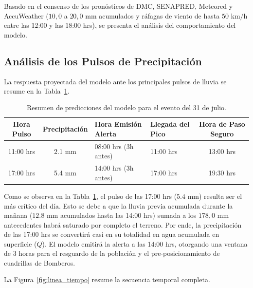 \documentclass[11pt,a4paper]{article}
\begin{document}
Basado en el consenso de los pronósticos de DMC, SENAPRED, Meteored y AccuWeather ($10,0$ a $20,0\text{ mm}$ acumulados y ráfagas de viento de hasta $50\text{ km/h}$ entre las 12:00 y las 18:00 hrs), se presenta el análisis del comportamiento del modelo.

\subsection{Análisis de los Pulsos de Precipitación}

La respuesta proyectada del modelo ante los principales pulsos de lluvia se resume en la Tabla~\ref{tab:pulsos}.

\begin{table}[htbp]
\centering
\caption{Resumen de predicciones del modelo para el evento del 31 de julio.}
\vspace{0.2cm}
\begin{tabular}{@{}ccllc@{}}
\toprule
\textbf{Hora Pulso} & \textbf{Precipitación} & \textbf{Hora Emisión Alerta} & \textbf{Llegada del Pico} & \textbf{Hora de Paso Seguro} \\ \midrule
11:00 hrs & 2.1 mm & 08:00 hrs (3h antes) & 11:00 hrs & 13:00 hrs \\
17:00 hrs & 5.4 mm & 14:00 hrs (3h antes) & 17:00 hrs & 19:30 hrs \\ \bottomrule
\end{tabular}
\label{tab:pulsos}
\end{table}

Como se observa en la Tabla~\ref{tab:pulsos}, el pulso de las 17:00 hrs ($5.4\text{ mm}$) resulta ser el más crítico del día. Esto se debe a que la lluvia previa acumulada durante la mañana ($12.8\text{ mm}$ acumulados hasta las 14:00 hrs) sumada a los $178,0\text{ mm}$ antecedentes habrá saturado por completo el terreno. Por ende, la precipitación de las 17:00 hrs se convertirá casi en su totalidad en agua acumulada en superficie ($Q$). El modelo emitirá la alerta a las 14:00 hrs, otorgando una ventana de 3 horas para el resguardo de la población y el pre-posicionamiento de cuadrillas de Bomberos.

La Figura~\ref{fig:linea_tiempo} resume la secuencia temporal completa.
\end{document}
